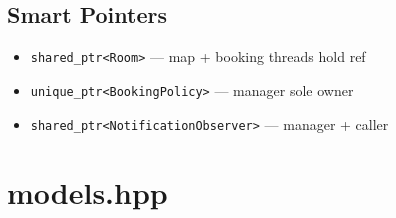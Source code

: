 \documentclass[11pt,a4paper]{article}
\begin{document}
\subsection{Smart Pointers}
\begin{itemize}
    \item \texttt{shared\_ptr<Room>} --- map + booking threads hold ref
    \item \texttt{unique\_ptr<BookingPolicy>} --- manager sole owner
    \item \texttt{shared\_ptr<NotificationObserver>} --- manager + caller
\end{itemize}

\newpage
\section{models.hpp}
\end{document}
